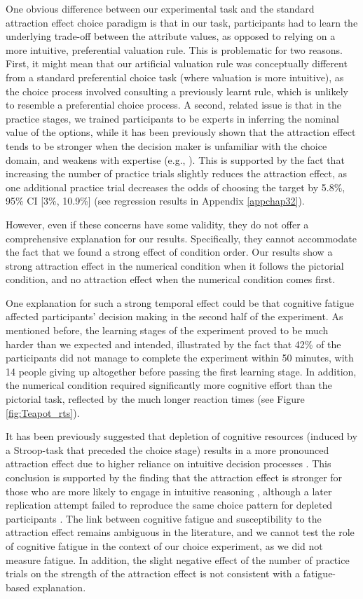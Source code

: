 \documentclass[11pt,a4paper]{article}
\begin{document}
One obvious difference between our experimental task and the standard attraction effect choice paradigm is that in our task, participants had to learn the underlying trade-off between the attribute values, as opposed to relying on a more intuitive, preferential valuation rule. This is problematic for two reasons. First, it might mean that our artificial valuation rule was conceptually different from a standard preferential choice task (where valuation is more intuitive), as the choice process involved consulting a previously learnt rule, which is unlikely to resemble a preferential choice process. A second, related issue is that in the practice stages, we trained participants to be experts in inferring the nominal value of the options, while it has been previously shown that the attraction effect tends to be stronger when the decision maker is unfamiliar with the choice domain, and weakens with expertise (e.g., ). This is supported by the fact that increasing the number of practice trials slightly reduces the attraction effect, as one additional practice trial decreases the odds of choosing the target by 5.8\%, 95\% CI [3\%, 10.9\%] (see regression results in Appendix \ref{appchap32}).

However, even if these concerns have some validity, they do not offer a comprehensive explanation for our results. Specifically, they cannot accommodate the fact that we found a strong effect of condition order. Our results show a strong attraction effect in the numerical condition when it follows the pictorial condition, and no attraction effect when the numerical condition comes first. 

One explanation for such a strong temporal effect could be that cognitive fatigue affected participants' decision making in the second half of the experiment. As mentioned before, the learning stages of the experiment proved to be much harder than we expected and intended, illustrated by the fact that 42\% of the participants did not manage to complete the experiment within 50 minutes, with 14 people giving up altogether before passing the first learning stage. In addition, the numerical condition required significantly more cognitive effort than the pictorial task, reflected by the much longer reaction times (see Figure \ref{fig:Teapot_rts}). 

It has been previously suggested that depletion of cognitive resources (induced by a Stroop-task that preceded the choice stage) results in a more pronounced attraction effect due to higher reliance on intuitive decision processes \cite{Pocheptsova2009a}. This conclusion is supported by the finding that the attraction effect is stronger for those who are more likely to engage in intuitive reasoning \cite{Mao2012}, although a later replication attempt failed to reproduce the same choice pattern for depleted participants \cite{DeHaan2015}.  
The link between cognitive fatigue and susceptibility to the attraction effect remains ambiguous in the literature, and we cannot test the role of cognitive fatigue in the context of our choice experiment, as we did not measure fatigue. In addition, the slight negative effect of the number of practice trials on the strength of the attraction effect is not consistent with a fatigue-based explanation.
\end{document}
